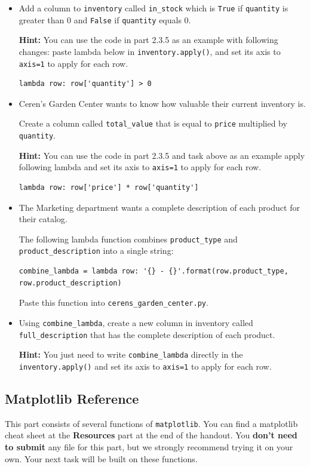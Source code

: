 \documentclass[a4paper]{article}
\begin{document}
\begin{itemize}
\item 
Add a column to \texttt{inventory} called \texttt{in\_stock} which is \texttt{True} if \texttt{quantity} is greater than 0 and \texttt{False} if \texttt{quantity} equals 0. 

\textbf{Hint:} You can use the code in part 2.3.5 as an example with following changes: paste lambda below in \texttt{inventory.apply()}, and set its axis to \texttt{axis=1} to apply for each row.
\begin{lstlisting}
lambda row: row['quantity'] > 0
\end{lstlisting}{}

\item
Ceren's Garden Center wants to know how valuable their current inventory is.

Create a column called \texttt{total\_value} that is equal to \texttt{price} multiplied by \texttt{quantity}.

\textbf{Hint:} You can use the code in part 2.3.5 and task above as an example apply following lambda and set its axis to \texttt{axis=1} to apply for each row.
\begin{lstlisting}
lambda row: row['price'] * row['quantity']
\end{lstlisting}{}

\item
The Marketing department wants a complete description of each product for their catalog.

The following lambda function combines \texttt{product\_type} and \texttt{product\_description} into a single string:

\begin{lstlisting}
combine_lambda = lambda row: '{} - {}'.format(row.product_type, row.product_description)
\end{lstlisting}{}

Paste this function into \texttt{cerens\_garden\_center.py}.

\item
Using \texttt{combine\_lambda}, create a new column in inventory called \texttt{full\_description} that has the complete description of each product.

\textbf{Hint:} You just need to write \texttt{combine\_lambda} directly in the \texttt{inventory.apply()} and set its axis to \texttt{axis=1} to apply for each row.
\end{itemize}{}

\subsection{Matplotlib Reference}
This part consists of several functions of \texttt{matplotlib}. You can find a matplotlib cheat sheet at the \textbf{Resources} part at the end of the handout. You \textbf{don't need to submit} any file for this part, but we strongly recommend trying it on your own. Your next task will be built on these functions.
\end{document}
